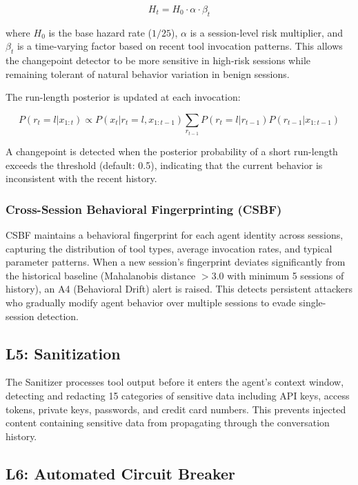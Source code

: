 \documentclass[10pt,conference]{IEEEtran}
\begin{document}
\begin{equation}
H_t = H_0 \cdot \alpha \cdot \beta_t
\end{equation}

where $H_0$ is the base hazard rate ($1/25$), $\alpha$ is a session-level risk multiplier, and $\beta_t$ is a time-varying factor based on recent tool invocation patterns. This allows the changepoint detector to be more sensitive in high-risk sessions while remaining tolerant of natural behavior variation in benign sessions.

The run-length posterior is updated at each invocation:

\begin{equation}
P(r_t = l | x_{1:t}) \propto P(x_t | r_t = l, x_{1:t-1}) \sum_{r_{t-1}} P(r_t = l | r_{t-1}) P(r_{t-1} | x_{1:t-1})
\end{equation}

A changepoint is detected when the posterior probability of a short run-length exceeds the threshold (default: 0.5), indicating that the current behavior is inconsistent with the recent history.

\subsubsection{Cross-Session Behavioral Fingerprinting (CSBF)}

CSBF maintains a behavioral fingerprint for each agent identity across sessions, capturing the distribution of tool types, average invocation rates, and typical parameter patterns. When a new session's fingerprint deviates significantly from the historical baseline (Mahalanobis distance $> 3.0$ with minimum 5 sessions of history), an A4 (Behavioral Drift) alert is raised. This detects persistent attackers who gradually modify agent behavior over multiple sessions to evade single-session detection.

\subsection{L5: Sanitization}

The Sanitizer processes tool output before it enters the agent's context window, detecting and redacting 15 categories of sensitive data including API keys, access tokens, private keys, passwords, and credit card numbers. This prevents injected content containing sensitive data from propagating through the conversation history.

\subsection{L6: Automated Circuit Breaker}
\end{document}
